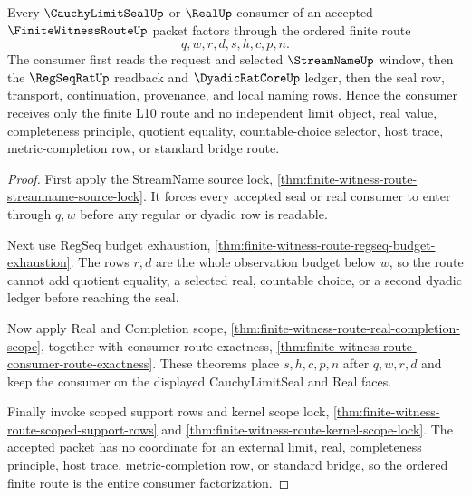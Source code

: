 \begin{theorem}
\label{thm:finite-witness-route-real-seal-factorization}
Every $\CauchyLimitSealUp$ or $\RealUp$ consumer of an accepted $\FiniteWitnessRouteUp$ packet factors through the ordered finite route
$$
q,w,r,d,s,h,c,p,n.
$$
The consumer first reads the request and selected $\StreamNameUp$ window, then the $\RegSeqRatUp$ readback and $\DyadicRatCoreUp$ ledger, then the seal row, transport, continuation, provenance, and local naming rows. Hence the consumer receives only the finite L10 route and no independent limit object, real value, completeness principle, quotient equality, countable-choice selector, host trace, metric-completion row, or standard bridge route.
\end{theorem}
\begin{proof}
First apply the StreamName source lock, \autoref{thm:finite-witness-route-streamname-source-lock}. It forces every accepted seal or real consumer to enter through $q,w$ before any regular or dyadic row is readable.

Next use RegSeq budget exhaustion, \autoref{thm:finite-witness-route-regseq-budget-exhaustion}. The rows $r,d$ are the whole observation budget below $w$, so the route cannot add quotient equality, a selected real, countable choice, or a second dyadic ledger before reaching the seal.

Now apply Real and Completion scope, \autoref{thm:finite-witness-route-real-completion-scope}, together with consumer route exactness, \autoref{thm:finite-witness-route-consumer-route-exactness}. These theorems place $s,h,c,p,n$ after $q,w,r,d$ and keep the consumer on the displayed CauchyLimitSeal and Real faces.

Finally invoke scoped support rows and kernel scope lock, \autoref{thm:finite-witness-route-scoped-support-rows} and \autoref{thm:finite-witness-route-kernel-scope-lock}. The accepted packet has no coordinate for an external limit, real, completeness principle, host trace, metric-completion row, or standard bridge, so the ordered finite route is the entire consumer factorization.
\end{proof}

